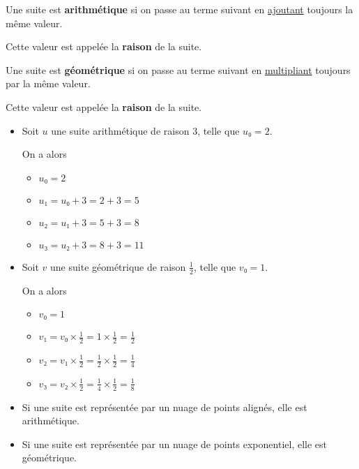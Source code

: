 \documentclass[
	classe=$1^{ere}STI2D$
]{coursclass}
\begin{document}
\begin{definition}
	Une suite est \textbf{arithmétique} si on passe au terme suivant en \uline{ajoutant} toujours la même valeur.

	Cette valeur est appelée la \textbf{raison} de la suite.
\end{definition}

\begin{definition}
	Une suite est \textbf{géométrique} si on passe au terme suivant en \uline{multipliant} toujours par la même valeur.

	Cette valeur est appelée la \textbf{raison} de la suite.
\end{definition}

\begin{exemple}
	\begin{itemize}
		\item Soit $u$ une suite arithmétique de raison $3$, telle que $u₀ = 2$.

		      On a alors
		      \begin{itemize}
			      \item $u₀ = 2$
			      \item $u₁ = u₀ + 3 = 2 + 3 = 5$
			      \item $u₂ = u₁ + 3 = 5 + 3 = 8$
			      \item $u₃ = u₂ + 3 = 8 + 3 = 11$
		      \end{itemize}
		\item Soit $v$ une suite géométrique de raison $\frac{1}{2}$, telle que $v₀	= 1$.

		      On a alors
		      \begin{itemize}
			      \setlength{\itemsep}{0.6em}
			      \item $v₀ = 1$
			      \item $v₁ = v₀ × \frac{1}{2} = 1 × \frac{1}{2} = \frac{1}{2}$
			      \item $v₂ = v₁ × \frac{1}{2} = \frac{1}{2} × \frac{1}{2} = \frac{1}{4}$
			      \item $v₃ = v₂ × \frac{1}{2} = \frac{1}{4} × \frac{1}{2} = \frac{1}{8}$
		      \end{itemize}
	\end{itemize}
\end{exemple}

\begin{propriete}
	\begin{itemize}
		\item Si une suite est représentée par un nuage de points alignés, elle est arithmétique.
		\item Si une suite est représentée par un nuage de points exponentiel, elle est géométrique.
	\end{itemize}
\end{propriete}

\begin{exemple}
	
\end{exemple}
\end{document}
